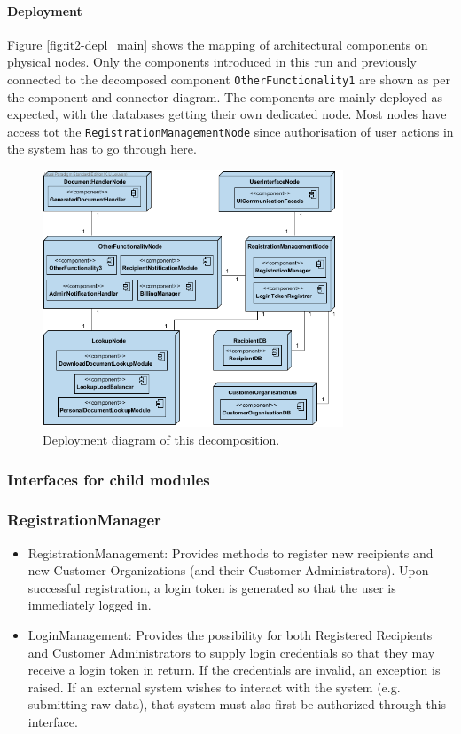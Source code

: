 \documentclass[a4paper,10pt]{article}
\begin{document}
\paragraph{Deployment}
Figure \ref{fig:it2-depl_main} shows the mapping of architectural components on physical nodes. Only the components introduced in this run and previously connected to the decomposed component \texttt{OtherFunctionality1} are shown as per the component-and-connector diagram. The components are mainly deployed as expected, with the databases getting their own dedicated node. Most nodes have access tot the \texttt{RegistrationManagementNode} since authorisation of user actions in the system has to go through here.

\begin{figure}[!htp]
    \centering
    \includegraphics[width=0.8\textwidth]{depl_diag_3.png}
    \caption{Deployment diagram of this decomposition.
        }\label{fig:it3-depl_main}
\end{figure}

\subsubsection{Interfaces for child modules}
\subsubsection*{RegistrationManager}
\begin{itemize}
    \item RegistrationManagement:
    Provides methods to register new recipients and new Customer Organizations (and their Customer Administrators). Upon successful registration, a login token is generated so that the user is immediately logged in.

    \item LoginManagement:
    Provides the possibility for both Registered Recipients and Customer Administrators to supply login credentials so that they may receive a login token in return. If the credentials are invalid, an exception is raised. If an external system wishes to interact with the system (e.g. submitting raw data), that system must also first be authorized through this interface.
\end{itemize}
\end{document}
